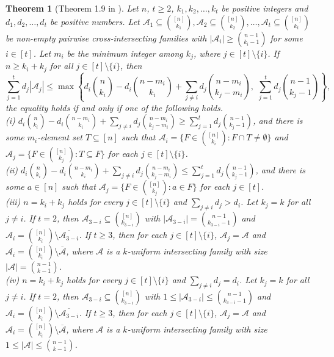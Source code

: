 \documentclass[a4paper,11pt]{article}
\newtheorem{theorem}{Theorem}[section]
\begin{document}
\begin{theorem}[Theorem 1.9   in \cite{HP+}]  \label{thm1.9}
Let $n$, $t\geq 2$, $k_1, k_2, \dots, k_t$ be positive integers and $d_1, d_2, \dots, d_t$ be positive numbers. Let
$\mathcal{A}_1\subseteq{[n]\choose k_1}, \mathcal{A}_2\subseteq{[n]\choose k_2}, \dots, \mathcal{A}_t\subseteq{[n]\choose k_t}$ be non-empty pairwise cross-intersecting families with $|\mathcal{A}_i|\geq {n-1\choose k_i-1}$ for some $i\in [t]$. Let $m_i$ be the minimum integer among $k_j$, where $j\in [t]\setminus \{i\}$. If $n\geq k_i+k_j$ for all $j\in [t]\setminus \{i\}$, then
\begin{equation}\label{new1}
\sum_{j=1}^td_j|\mathcal{A}_j|\leq \max  \left\{d_i{n\choose k_i}-d_i{n-m_i\choose k_i}+\sum_{j\ne i}d_j{n-m_i\choose k_j-m_i}, \,\,\sum_{j=1}^td_j{n-1\choose k_j-1}\right\},
\end{equation}
the equality holds if and only if one of the following holds.\\
(i)  $d_i{n\choose k_i}-d_i{n-m_i \choose k_i}+\sum_{j\ne i}d_j{n-m_i\choose k_j-m_i}\geq \sum_{j=1}^td_j{n-1\choose k_j-1}$, and  there is some $m_i$-element set $T\subseteq [n]$ such that $\mathcal{A}_i=\{F\in {[n]\choose k_i}: F\cap T\ne\emptyset\}$ and $\mathcal{A}_j=\{F\in {[n]\choose k_j}: T\subseteq F\}$ for each $j\in [t]\setminus \{i\}$.\\
(ii) $d_i{n\choose k_i}-d_i{n-m_i \choose k_i}+\sum_{j\ne i}d_j{n-m_i\choose k_j-m_i}\leq \sum_{j=1}^td_j{n-1\choose k_j-1}$, and
 there is some $a\in [n]$ such that $\mathcal{A}_j=\{F\in{[n]\choose k_j}: a\in F\}$ for each $j\in [t]$. \\
(iii) $n=k_i+k_j$ holds for every $j\in [t]\setminus \{i\}$ and $\sum_{j\ne i}d_j>d_i$. Let $k_j=k$ for all $j\ne i$.
If $t=2$, then $\mathcal{A}_{3-i}\subseteq {[n]\choose k_{3-i}}$ with $|\mathcal{A}_{3-i}|={n-1\choose k_{3-i}-1}$ and $\mathcal{A}_i={[n]\choose k_i}\setminus \overline{\mathcal{A}_{3-i}}$.  If $t\geq3$, then for each $j\in [t]\setminus \{i\}$, $\mathcal{A}_j=\mathcal{A}$ and $\mathcal{A}_i={[n]\choose k_i}\setminus \overline{\mathcal{A}}$, where $\mathcal{A}$ is a $k$-uniform intersecting family with size $|\mathcal{A}|= {n-1\choose k-1}$.\\
(iv) $n=k_i+k_j$ holds for every $j\in [t]\setminus \{i\}$ and $\sum_{j\ne i}d_j=d_i$. Let $k_j=k$ for all $j\ne i$.
If $t=2$, then $\mathcal{A}_{3-i}\subseteq {[n]\choose k_{3-i}}$ with $1\leq|\mathcal{A}_{3-i}|\leq{n-1\choose k_{3-i}-1}$ and $\mathcal{A}_i={[n]\choose k_i}\setminus \overline{\mathcal{A}_{3-i}}$.
If $t\geq3$, then for each $j\in [t]\setminus \{i\}$, $\mathcal{A}_j=\mathcal{A}$ and $\mathcal{A}_i={[n]\choose k_i}\setminus \overline{\mathcal{A}}$, where $\mathcal{A}$ is a $k$-uniform intersecting family with size $1\leq |\mathcal{A}|\leq {n-1\choose k-1}$.
\end{theorem}
\end{document}
